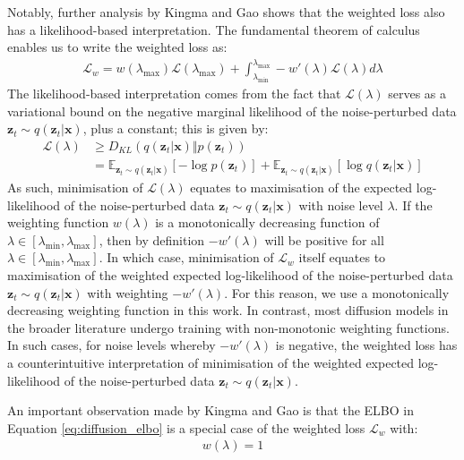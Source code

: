 \documentclass[ oneside,%
                    author={George Herbert},
                    degree={MSci},
                     title={Video Diffusion Models for Climate Simulations},
                  subtitle={}]{dissertation}
\begin{document}
Notably, further analysis by Kingma and Gao \cite{Understanding_Diffusion_Objective_Kingma} shows that the weighted loss also has a likelihood-based interpretation. The fundamental theorem of calculus enables us to write the weighted loss as:
\begin{align}
      \mathcal{L}_w = w(\lambda_{\max})\mathcal{L}(\lambda_{\max}) + \int_{\lambda_{\min}}^{\lambda_{\max}}-w'(\lambda)\mathcal{L}(\lambda) d\lambda
\end{align}
The likelihood-based interpretation comes from the fact that $\mathcal{L}(\lambda)$ serves as a variational bound on the negative marginal likelihood of the noise-perturbed data $\mathbf{z}_t\sim q(\mathbf{z}_t|\mathbf{x})$, plus a constant; this is given by:
\begin{align}
      \mathcal{L}(\lambda)&\ge D_{KL}(q(\mathbf{z}_t|\mathbf{x})\Vert p(\mathbf{z}_t))\\
      &=\mathbb{E}_{\mathbf{z}_t\sim q(\mathbf{z}_t|\mathbf{x})}\left[-\log p(\mathbf{z}_t)\right]+\mathbb{E}_{\mathbf{z}_t\sim q(\mathbf{z}_t|\mathbf{x})}\left[\log q(\mathbf{z}_t|\mathbf{x})\right]
\end{align}
As such, minimisation of $\mathcal{L}(\lambda)$ equates to maximisation of the expected log-likelihood of the noise-perturbed data $\mathbf{z}_t\sim q(\mathbf{z}_t|\mathbf{x})$ with noise level $\lambda$. If the weighting function $w(\lambda)$ is a monotonically decreasing function of $\lambda\in [\lambda_{\min}, \lambda_{\max}]$, then by definition $-w'(\lambda)$ will be positive for all $\lambda\in [\lambda_{\min}, \lambda_{\max}]$. In which case, minimisation of $\mathcal{L}_w$ itself equates to maximisation of the weighted expected log-likelihood of the noise-perturbed data $\mathbf{z}_t\sim q(\mathbf{z}_t|\mathbf{x})$ with weighting $-w'(\lambda)$. For this reason, we use a monotonically decreasing weighting function in this work. In contrast, most diffusion models in the broader literature undergo training with non-monotonic weighting functions. In such cases, for noise levels whereby $-w'(\lambda)$ is negative, the weighted loss has a counterintuitive interpretation of minimisation of the weighted expected log-likelihood of the noise-perturbed data $\mathbf{z}_t\sim q(\mathbf{z}_t|\mathbf{x})$.

An important observation made by Kingma and Gao \cite{Understanding_Diffusion_Objective_Kingma} is that the ELBO in Equation \ref{eq:diffusion_elbo} is a special case of the weighted loss $\mathcal{L}_w$ with:
\begin{align}
      w(\lambda) = 1
\end{align}
\end{document}
